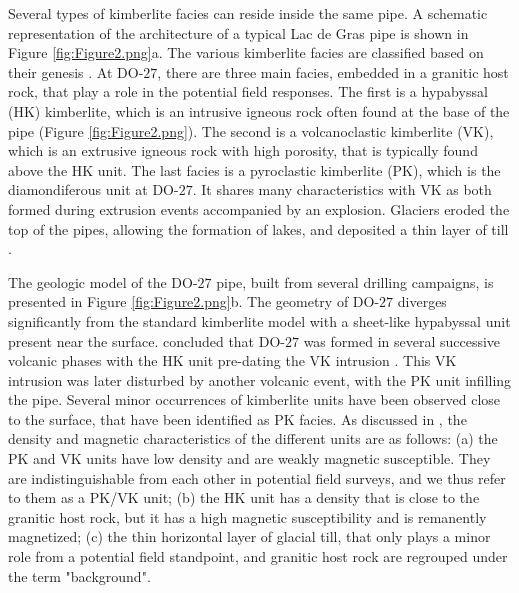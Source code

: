 \documentclass[paper, twocolumn]{geophysics} %
\begin{document}

Several types of kimberlite facies can reside inside the same pipe. A schematic representation of the architecture of a typical Lac de Gras pipe is shown in Figure \ref{fig:Figure2.png}a. The various kimberlite facies are classified based on their genesis \citep{KimberliteModel0,KimberliteModel1}. At DO-$27$, there are three main facies, embedded in a granitic host rock, that play a role in the potential field responses. The first is a hypabyssal (HK) kimberlite, which is an intrusive igneous rock often found at the base of the pipe (Figure \ref{fig:Figure2.png}). The second is a volcanoclastic kimberlite (VK), which is an extrusive igneous rock with high porosity, that is typically found above the HK unit. The last facies is a pyroclastic kimberlite (PK), which is the diamondiferous unit at DO-$27$. It shares many characteristics with VK as both formed during extrusion events accompanied by an explosion. Glaciers eroded the top of the pipes, allowing the formation of lakes, and deposited a thin layer of till \citep{Dyke,Doyle}.

The geologic model of the DO-$27$ pipe, built from several drilling campaigns, is presented in Figure \ref{fig:Figure2.png}b. The geometry of DO-$27$ diverges significantly from the standard kimberlite model with a sheet-like hypabyssal unit present near the surface. \citet{HARDER2009} concluded that DO-$27$ was formed in several successive volcanic phases with the HK unit pre-dating the VK intrusion \citep{Doyle}. This VK intrusion was later disturbed by another volcanic event, with the PK unit infilling the pipe. Several minor occurrences of kimberlite units have been observed close to the surface, that have been identified as PK facies. As discussed in \citet{TKCpaper}, the density and magnetic characteristics of the different units are as follows: (a) the PK and VK units have low density and are weakly magnetic susceptible. They are indistinguishable from each other in potential field surveys, and we thus refer to them as a PK/VK unit; (b) the HK unit has a density that is close to the granitic host rock, but it has a high magnetic susceptibility and is remanently magnetized; (c) the thin horizontal layer of glacial till, that only plays a minor role from a potential field standpoint, and granitic host rock are regrouped under the term "background".
\end{document}
